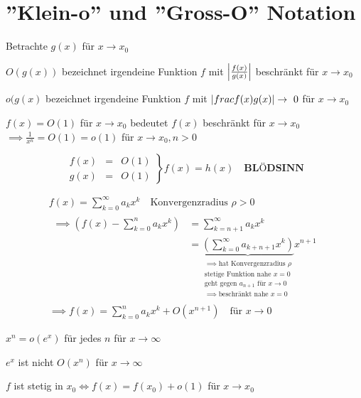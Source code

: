 \section{''Klein-o'' und ''Gross-O'' Notation}
Betrachte $g(x)$ für $x \rightarrow x_0$\\
\begin{def*}[note = Gross O , index = gross O]
	$O(g(x))$ bezeichnet irgendeine Funktion $f$ mit $\abs{\frac{f(x)}{g(x)}}$ beschränkt für $x \rightarrow x_0$
\end{def*}
\begin{def*}[note = Klein o , index = klein o]
	$o(g(x)$ bezeichnet irgendeine Funktion $f$ mit $\abs{frac{f(x)}{g(x)}} \rightarrow 0$ für $x \rightarrow x_0$
\end{def*}
\begin{bsp*}
	$f(x) = O(1)$ für $x \rightarrow x_0$ bedeutet $f(x)$ beschränkt für $x \rightarrow x_0$ \\
	$\implies \frac{1}{x^n} = O(1) = o(1)$ für $x \rightarrow x_0, n > 0$
\end{bsp*}
\[ \left. \begin{matrix}
	f(x)	&=	&O(1)	\\
	g(x)	&=	&O(1)	
\end{matrix} \right\} f(x) = h(x) \quad \textbf{BLÖDSINN} \]
\begin{bsp*}
	\begin{gather*}
		f(x) = \sum_{k=0}^\infty a_k x^k \quad \text{Konvergenzradius } \rho > 0 \\
		\begin{split}
			\implies \left( f(x) - \sum_{k=0}^n a_k x^k \right)	&= \sum_{k=n+1}^\infty a_k x^k \\
												&= \underbrace{\left(\sum_{k=0}^\infty a_{k+n+1} x^k \right)}_{\substack{\implies\text{hat Konvergenzradius }\rho\\\text{stetige Funktion nahe } x=0\\\text{geht gegen } a_{n+1} \text{ für } x \rightarrow 0\\\implies\text{beschränkt nahe } x=0}} x^{n+1}
		\end{split} \\
		\implies f(x) = \sum_{k=0}^n a_k x^k + O(x^{n+1}) \quad \text{für } x \rightarrow 0
	\end{gather*}
\end{bsp*}
\begin{bsp*}
	$x^n = o(e^x)$ für jedes $n$ für $x \rightarrow \infty$
\end{bsp*}
\begin{bsp*}
	$e^x$ ist nicht $O(x^n)$ für $x \rightarrow \infty$
\end{bsp*}
\begin{bem}
	$f$ ist stetig in $x_0 \iff f(x) = f(x_0) + o(1)$ für $x \rightarrow x_0$
\end{bem}

